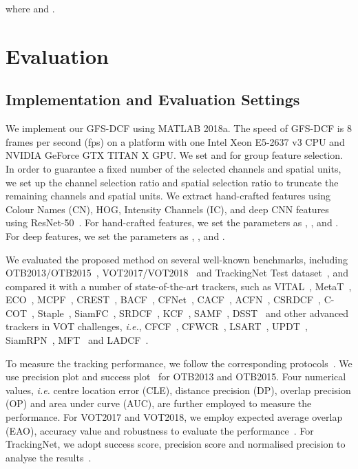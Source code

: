 \documentclass[10pt,twocolumn,letterpaper]{article}
\begin{document}
where 
and
.

\section{Evaluation}
\label{experiment}
\subsection{Implementation and Evaluation Settings}
\label{sec_setting}
We implement our GFS-DCF using MATLAB 2018a.
The speed of GFS-DCF is 8 frames per second (fps) on a platform with one Intel Xeon E5-2637 v3 CPU and NVIDIA GeForce GTX TITAN X GPU. 
We set  and  for group feature selection. In order to guarantee a fixed number of the selected channels and spatial units, we set up the channel selection ratio  and spatial selection ratio  to truncate the remaining channels and spatial units.
We extract hand-crafted features using Colour Names (CN), HOG, Intensity Channels (IC), and deep CNN features using ResNet-50~\cite{he2016deep,vedaldi2015matconvnet}.
For hand-crafted features, we set the parameters as , ,  and .
For deep features, we set the parameters as , ,  and .

We evaluated the proposed method on several well-known benchmarks, including OTB2013/OTB2015~\cite{Wu2013Online,Wu2015Object},  VOT2017/VOT2018~\cite{Kristan2017a,Kristan2018a} and TrackingNet Test dataset~\cite{muller2018trackingnet}, and compared it with a number of state-of-the-art trackers, such as VITAL~\cite{song2018vital}, MetaT~\cite{park2018meta}, ECO~\cite{Danelljan2016ECO}, MCPF~\cite{zhang2017multi}, CREST~\cite{song-iccv17-CREST}, BACF~\cite{Galoogahi2017Learning}, CFNet~\cite{valmadre2017end}, CACF~\cite{mueller2017context}, ACFN~\cite{choi2017attentional}, CSRDCF~\cite{Lukezic2017Discriminative}, C-COT~\cite{Danelljan2016Beyond}, Staple~\cite{Bertinetto2016Staple}, SiamFC~\cite{bertinetto2016fully},  SRDCF~\cite{Danelljan2015Learning}, KCF~\cite{Henriques2015High}, SAMF~\cite{li2014scale},  DSST~\cite{danelljan2017discriminative} and other advanced trackers in VOT challenges, \textit{i.e.},  CFCF~\cite{gundogdu2018good},  CFWCR~\cite{he2017correlation},  LSART~\cite{sun2018learning},  UPDT~\cite{bhat2018unveiling},  SiamRPN~\cite{zhu2018distractor},  MFT~\cite{Kristan2018a} and LADCF~\cite{xu2018learning}.

To measure the tracking performance, we follow the corresponding protocols~\cite{Wu2015Object,Kristan2016The,kristan2016novel}.
We use precision plot and success plot~\cite{Wu2013Online} for OTB2013 and OTB2015. 
Four numerical values, \textit{i.e.} centre location error (CLE), distance precision (DP), overlap precision (OP) and area under curve (AUC), are further employed to measure the performance.
For VOT2017 and VOT2018, we employ expected average overlap (EAO), accuracy value and robustness to evaluate the performance~\cite{Kristan2016The}.
For TrackingNet, we adopt success score, precision score and normalised precision to analyse the results~\cite{muller2018trackingnet}.
\end{document}
